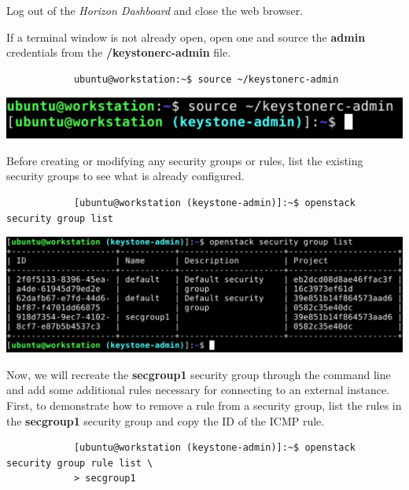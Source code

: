 \documentclass[letterpaper, 12pt]{article}
\begin{document}
\begin{enumerate}
    \begin{labstep}
        Log out of the \textit{Horizon Dashboard} and close the web browser.
    \end{labstep}

    \begin{labstep}
        If a terminal window is not already open, open one and source the \textbf{admin} credentials from the
        \textbf{\texttildemid/keystonerc-admin} file.
        \begin{lstlisting}
            ubuntu@workstation:~$ source ~/keystonerc-admin
        \end{lstlisting}

        \begin{center}
            \includegraphics[width=\linewidth]{images/part1/step11.png}
        \end{center}
    \end{labstep}

    \begin{labstep}
        Before creating or modifying any security groups or rules, list the existing security groups to see what is already configured.
        \begin{lstlisting}
            [ubuntu@workstation (keystone-admin)]:~$ openstack security group list
        \end{lstlisting}

        \begin{center}
            \includegraphics[width=\linewidth]{images/part1/step12.png}
        \end{center}
    \end{labstep}

    \begin{labstep}
        Now, we will recreate the \textbf{secgroup1} security group through the command line and add some additional rules necessary for connecting to an external instance.
        First, to demonstrate how to remove a rule from a security group, list the rules in the \textbf{secgroup1} security group and copy the ID of the ICMP rule.
        \begin{lstlisting}
            [ubuntu@workstation (keystone-admin)]:~$ openstack security group rule list \
            > secgroup1
        \end{lstlisting}


\end{labstep}
\end{enumerate}
\end{document}
